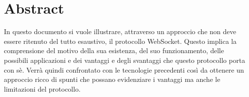 \chapter*{Abstract}

In questo documento si vuole illustrare, attraverso un approccio che non deve essere ritenuto del tutto esaustivo, il protocollo WebSocket.
Questo implica la comprensione del motivo della sua esistenza, del suo funzionamento, delle possibili applicazioni e dei vantaggi e degli svantaggi che questo protocollo porta con sè.
Verrà quindi confrontato con le tecnologie precedenti così da ottenere un approccio ricco di spunti che possano evidenziare i vantaggi ma anche le limitazioni del protocollo.